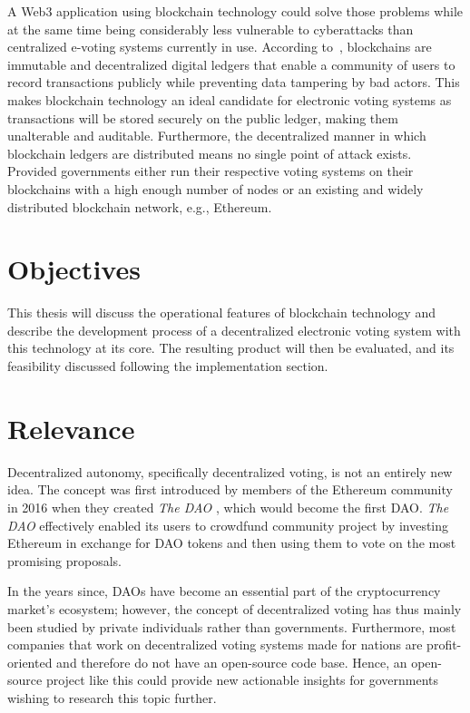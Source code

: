 A \Gls{Web3} application using blockchain technology could solve those problems while at the same time being considerably less vulnerable to cyberattacks than centralized e-voting systems currently in use.
According to~\textcite{yaga_blockchain_2018}, blockchains are immutable and decentralized digital ledgers that enable a community of users to record transactions publicly while preventing data tampering by bad actors.
This makes blockchain technology an ideal candidate for electronic voting systems as transactions will be stored securely on the public ledger, making them unalterable and auditable.
Furthermore, the decentralized manner in which blockchain ledgers are distributed means no single point of attack exists.
Provided governments either run their respective voting systems on their blockchains with a high enough number of nodes or an existing and widely distributed blockchain network, e.g., Ethereum.

\section{Objectives}\label{sec:objectives}

This thesis will discuss the operational features of blockchain technology and describe the development process of a decentralized electronic voting system with this technology at its core.
The resulting product will then be evaluated, and its feasibility discussed following the implementation section.

\section{Relevance}\label{sec:relevance}

Decentralized autonomy, specifically decentralized voting, is not an entirely new idea.
The concept was first introduced by members of the Ethereum community in 2016 when they created \emph{The DAO} \autocites[3.1]{el_faqir_overview_2020}{falkon_story_2018}, which would become the first \gls{DAO}.
\emph{The DAO} effectively enabled its users to crowdfund community project by investing Ethereum in exchange for DAO tokens and then using them to vote on the most promising proposals.

In the years since, \glspl{DAO} have become an essential part of the cryptocurrency market’s ecosystem;
however, the concept of decentralized voting has thus mainly been studied by private individuals rather than governments.
Furthermore, most companies that work on decentralized voting systems made for nations are profit-oriented and therefore do not have an open-source code base.
Hence, an open-source project like this could provide new actionable insights for governments wishing to research this topic further.


